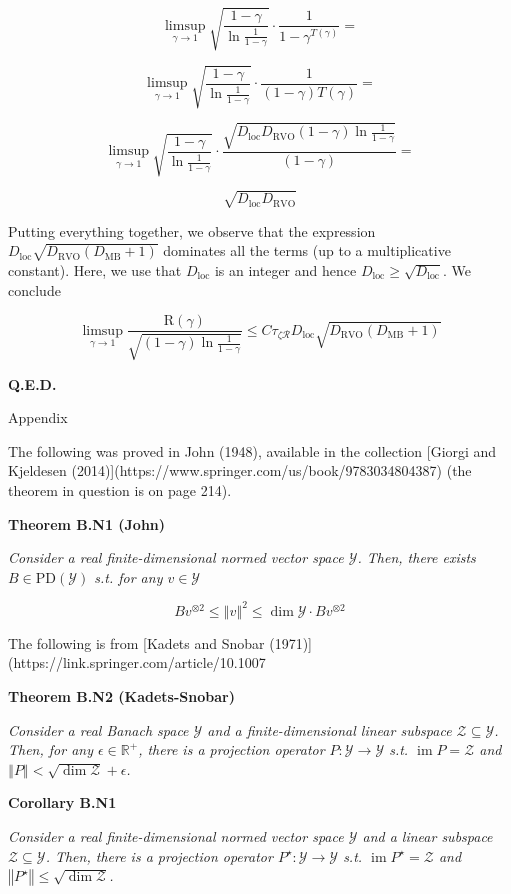 \documentclass[a4paper]{article}
\newcommand{\Co}[1]{}
\newcommand{\Reals}{\mathbb{R}}
\newcommand{\PD}{\mathrm{PD}}
\DeclareMathOperator{\Img}{im}
\newcommand{\Norm}[1]{\left\Vert #1 \right\Vert}
\newcommand{\Y}{\mathcal{Y}}
\newcommand{\Z}{\mathcal{Z}}
\newcommand{\R}{\mathcal{R}}
\newcommand{\DRVO}{D_{\mathrm{RVO}}}
\newcommand{\DMB}{D_{\mathrm{MB}}}
\newcommand{\DL}{D_{\mathrm{loc}}}
\newcommand{\Reg}{\mathrm{R}}
\begin{document}
$$\limsup_{\gamma\rightarrow1}{\sqrt{\frac{1-\gamma}{\ln{\frac{1}{1-\gamma}}}}\cdot\frac{1}{1-\gamma^{T(\gamma)}}}=$$

$$\limsup_{\gamma\rightarrow1}{\sqrt{\frac{1-\gamma}{\ln{\frac{1}{1-\gamma}}}}\cdot\frac{1}{(1-\gamma)T(\gamma)}}=$$

$$\limsup_{\gamma\rightarrow1}{\sqrt{\frac{1-\gamma}{\ln{\frac{1}{1-\gamma}}}}\cdot\frac{\sqrt{\DL\DRVO(1-\gamma)\ln\frac{1}{1-\gamma}}}{(1-\gamma)}}=$$

$$\sqrt{\DL\DRVO}$$

Putting everything together, we observe that the expression $\DL\sqrt{\DRVO(\DMB+1)}$ dominates all the terms (up to a multiplicative constant). Here, we use that $\DL$ is an integer and hence $\DL\geq\sqrt{\DL}$. We conclude

$$\limsup_{\gamma\rightarrow1}{\frac{\Reg(\gamma)}{\sqrt{(1-\gamma)\ln{\frac{1}{1-\gamma}}}}}\leq C\tau_{\zeta\R}\DL\sqrt{\DRVO(\DMB+1)}$$

\textbf{Q.E.D.}\Co{b}

\begin{Huge}Appendix\end{Huge}

The following was proved in John (1948), available in the collection [Giorgi and Kjeldesen (2014)](https://www.springer.com/us/book/9783034804387) (the theorem in question is on page 214). 

\textbf{Theorem B.N1 (John)}\Co{b}

\textit{Consider a real finite-dimensional normed vector space $\Y$. Then, there exists $B\in\PD(\Y)$ s.t. for any $v\in\Y$}\Co{i}

$$Bv^{\otimes2}\leq\Norm{v}^2\leq\dim{\Y}\cdot Bv^{\otimes2}$$

The following is from [Kadets and Snobar (1971)](https://link.springer.com/article/10.1007%

\textbf{Theorem B.N2 (Kadets-Snobar)}\Co{b}

\textit{Consider a real Banach space $\Y$ and a finite-dimensional linear subspace $\Z\subseteq\Y$. Then, for any $\epsilon\in\Reals^+$, there is a projection operator $P:\Y\rightarrow\Y$ s.t. $\Img{P}=\Z$ and $\Norm{P}<\sqrt{\dim{\Z}}+\epsilon$.}\Co{i}

\textbf{Corollary B.N1}\Co{b}

\textit{Consider a real finite-dimensional normed vector space $\Y$ and a linear subspace $\Z\subseteq\Y$. Then, there is a projection operator $P^\star:\Y\rightarrow\Y$ s.t. $\Img{P^\star}=\Z$ and $\Norm{P^\star}\leq\sqrt{\dim{\Z}}$.}\Co{i}
\end{document}
